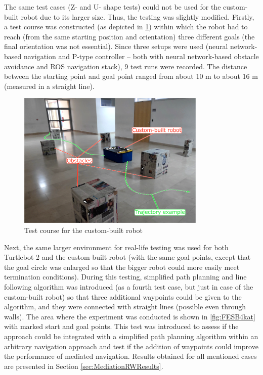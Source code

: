 The same test cases (Z- and U- shape tests) could not be used for the custom-built robot due to its larger size. Thus, the testing was slightly modified. Firstly, a test course was constructed (as depicted in \cref{fig:PaletarB401}) within which the robot had to reach (from the same starting position and orientation) three different goals (the final orientation was not essential). Since three setups were used (neural network-based navigation and P-type controller -- both with neural network-based obstacle avoidance and ROS navigation stack), 9 test runs were recorded. The distance between the starting point and goal point ranged from about 10 m to about 16 m (measured in a straight line).

\begin{figure}
    \centering
    \includegraphics[width=0.8\textwidth]{slike/Fig03_16.png}
    \caption{Test course for the custom-built robot}
    \label{fig:PaletarB401}
\end{figure}

Next, the same larger environment for real-life testing was used for both Turtlebot 2 and the custom-built robot (with the same goal points, except that the goal circle was enlarged so that the bigger robot could more easily meet termination conditions). During this testing, simplified path planning and line following algorithm was introduced (as a fourth test case, but just in case of the custom-built robot) so that three additional waypoints could be given to the algorithm, and they were connected with straight lines (possible even through walls). The area where the experiment was conducted is shown in \cref{fig:FESB4kat} with marked start and goal points. This test was introduced to assess if the approach could be integrated with a simplified path planning algorithm within an arbitrary navigation approach and test if the addition of waypoints could improve the performance of mediated navigation. Results obtained for all mentioned cases are presented in Section \ref{sec:MediationRWResults}.

